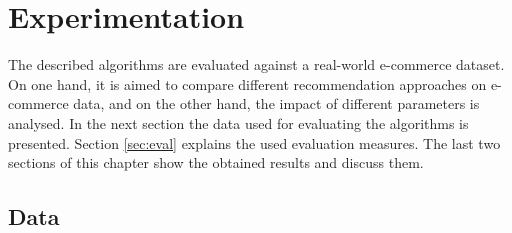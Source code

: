 \documentclass[10pt]{reportMaster}
\begin{document}
\chapter{Experimentation}
\label{chap:experimentation}
The described algorithms are evaluated against a real-world e-commerce dataset.
On one hand, it is aimed to compare different recommendation approaches on e-commerce data, and on the other hand, the impact of different parameters is analysed.
In the next section the data used for evaluating the algorithms is presented.
Section \ref{sec:eval} explains the used evaluation measures.
The last two sections of this chapter show the obtained results and discuss them.

\section{Data}
\label{sec:data}
\end{document}
